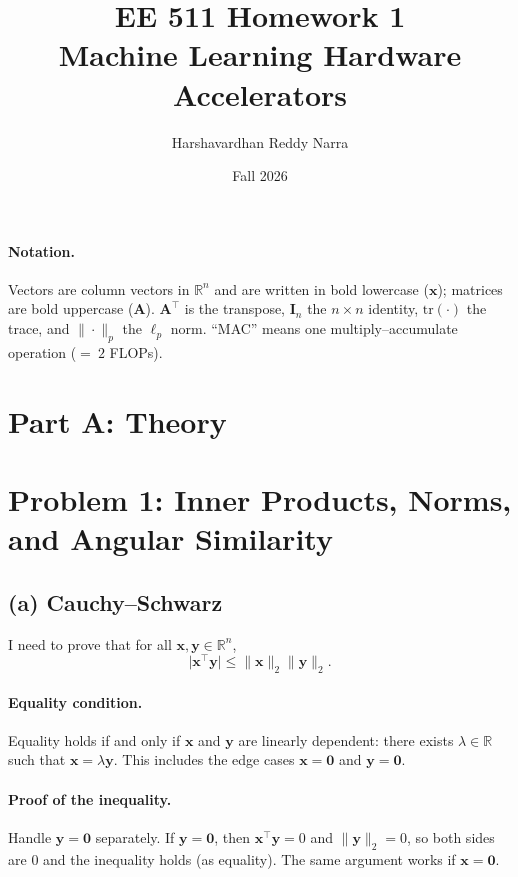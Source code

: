 \documentclass[11pt]{article}
\title{EE 511 Homework 1\\[0.4em]
\large Machine Learning Hardware Accelerators}
\author{Harshavardhan Reddy Narra}
\date{Fall 2026}
\newcommand{\vct}[1]{\mathbf{#1}}
\newcommand{\mat}[1]{\mathbf{#1}}
\begin{document}
\maketitle

\paragraph{Notation.}
Vectors are column vectors in \(\mathbb{R}^n\) and are written in bold
lowercase (\(\vct{x}\)); matrices are bold uppercase (\(\mat{A}\)).
\(\mat{A}^\top\) is the transpose, \(\mat{I}_n\) the \(n \times n\) identity,
\(\mathrm{tr}(\cdot)\) the trace, and \(\|\cdot\|_p\) the \(\ell_p\) norm.
``MAC'' means one multiply--accumulate operation (\(=\ 2\) FLOPs).

\tableofcontents
\newpage

\section*{Part A: Theory}

\section{Problem 1: Inner Products, Norms, and Angular Similarity}

\subsection*{(a) Cauchy--Schwarz}

I need to prove that for all \(\vct{x}, \vct{y} \in \mathbb{R}^n\),
\[
\bigl|\vct{x}^\top \vct{y}\bigr| \le \|\vct{x}\|_2 \|\vct{y}\|_2.
\]

\paragraph{Equality condition.}
Equality holds if and only if \(\vct{x}\) and \(\vct{y}\) are linearly
dependent: there exists \(\lambda \in \mathbb{R}\) such that
\(\vct{x} = \lambda \vct{y}\). This includes the edge cases
\(\vct{x} = \vct{0}\) and \(\vct{y} = \vct{0}\).

\paragraph{Proof of the inequality.}
Handle \(\vct{y} = \vct{0}\) separately. If \(\vct{y} = \vct{0}\), then
\(\vct{x}^\top \vct{y} = 0\) and \(\|\vct{y}\|_2 = 0\), so both sides are
\(0\) and the inequality holds (as equality). The same argument works if
\(\vct{x} = \vct{0}\).
\end{document}
